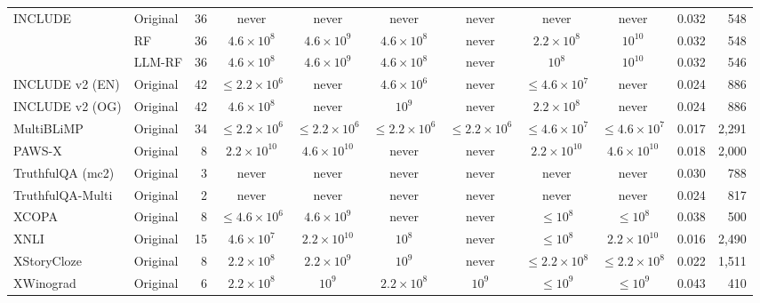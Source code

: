 \begin{tabular}{llrccccccrr}
\addlinespace
INCLUDE & Original & 36 & never & never & never & never & never & never & 0.032 & 548 \\
 & RF & 36 & $4.6\times10^{8}$ & $4.6\times10^{9}$ & $4.6\times10^{8}$ & never & $2.2\times10^{8}$ & $10^{10}$ & 0.032 & 548 \\
 & LLM-RF & 36 & $4.6\times10^{8}$ & $4.6\times10^{9}$ & $4.6\times10^{8}$ & never & $10^{8}$ & $10^{10}$ & 0.032 & 546 \\
\addlinespace
INCLUDE v2 (EN) & Original & 42 & $\leq 2.2\times10^{6}$ & never & $4.6\times10^{6}$ & never & $\leq 4.6\times10^{7}$ & never & 0.024 & 886 \\
\addlinespace
INCLUDE v2 (OG) & Original & 42 & $4.6\times10^{8}$ & never & $10^{9}$ & never & $2.2\times10^{8}$ & never & 0.024 & 886 \\
\addlinespace
MultiBLiMP & Original & 34 & $\leq 2.2\times10^{6}$ & $\leq 2.2\times10^{6}$ & $\leq 2.2\times10^{6}$ & $\leq 2.2\times10^{6}$ & $\leq 4.6\times10^{7}$ & $\leq 4.6\times10^{7}$ & 0.017 & 2{,}291 \\
\addlinespace
PAWS-X & Original & 8 & $2.2\times10^{10}$ & $4.6\times10^{10}$ & never & never & $2.2\times10^{10}$ & $4.6\times10^{10}$ & 0.018 & 2{,}000 \\
\addlinespace
TruthfulQA (mc2) & Original & 3 & never & never & never & never & never & never & 0.030 & 788 \\
\addlinespace
TruthfulQA-Multi & Original & 2 & never & never & never & never & never & never & 0.024 & 817 \\
\addlinespace
XCOPA & Original & 8 & $\leq 4.6\times10^{6}$ & $4.6\times10^{9}$ & never & never & $\leq 10^{8}$ & $\leq 10^{8}$ & 0.038 & 500 \\
\addlinespace
XNLI & Original & 15 & $4.6\times10^{7}$ & $2.2\times10^{10}$ & $10^{8}$ & never & $\leq 10^{8}$ & $2.2\times10^{10}$ & 0.016 & 2{,}490 \\
\addlinespace
XStoryCloze & Original & 8 & $2.2\times10^{8}$ & $2.2\times10^{9}$ & $10^{9}$ & never & $\leq 2.2\times10^{8}$ & $\leq 2.2\times10^{8}$ & 0.022 & 1{,}511 \\
\addlinespace
XWinograd & Original & 6 & $2.2\times10^{8}$ & $10^{9}$ & $2.2\times10^{8}$ & $10^{9}$ & $\leq 10^{9}$ & $\leq 10^{9}$ & 0.043 & 410 \\
\bottomrule
\end{tabular}



